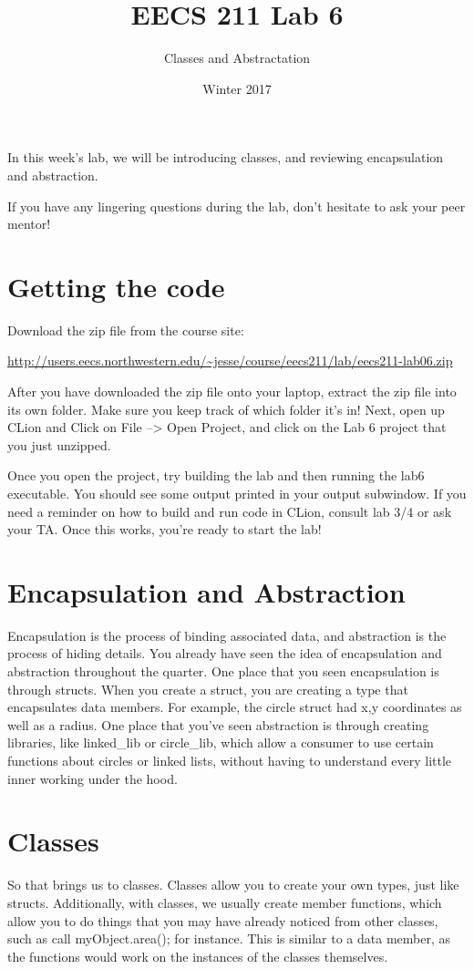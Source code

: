 \documentclass{tufte-handout}
\title{EECS 211 Lab 6}
\author{Classes and Abstractation}
\date{Winter 2017}
\begin{document}
\maketitle

In this week's lab, we will be introducing classes, and reviewing encapsulation and abstraction.

If you have any lingering questions during the lab, don't hesitate to ask your peer mentor!
\section{Getting the code}
Download the zip file from the course site: \medskip

\url{http://users.eecs.northwestern.edu/~jesse/course/eecs211/lab/eecs211-lab06.zip}

\medskip \noindent
After you have downloaded the zip file onto your laptop, extract the zip file into its own folder. Make sure you keep track of which folder it's in!  Next, open up CLion and Click on File --> Open Project, and click on the Lab 6 project that you just unzipped. 

Once you open the project, try building the lab and then running the lab6 executable. 
You should see some output printed in your output subwindow.
If you need a reminder on how to build and run code in CLion, consult lab 3/4 or ask your TA.
Once this works, you're ready to start the lab!

\section{Encapsulation and Abstraction}
Encapsulation is the process of binding associated data, and abstraction is the process of hiding details.
You already have seen the idea of encapsulation and abstraction throughout the quarter.
One place that you seen encapsulation is through structs.
When you create a struct, you are creating a type that encapsulates data members. For example, the circle struct had x,y coordinates as well as a radius. One place that you've seen abstraction is through creating libraries, like linked\_lib or circle\_lib, which allow a consumer to use certain functions about circles or linked lists, without having to understand every little inner working under the hood.

\section{Classes}
So that brings us to classes.  
Classes allow you to create your own types, just like structs.
Additionally, with classes, we usually create member functions, which allow you to do things that you may have already noticed from other classes, such as call myObject.area(); for instance.
This is similar to a data member, as the functions would work on the instances of the classes themselves.  
\end{document}
